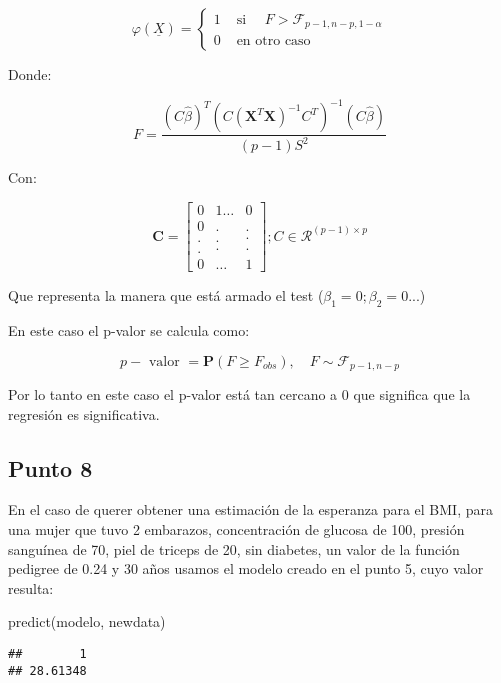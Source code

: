 \documentclass[
]{article}
\newenvironment{Shaded}{\begin{snugshade}}{\end{snugshade}}
\newcommand{\FunctionTok}[1]{\textcolor[rgb]{0.00,0.00,0.00}{#1}}
\newcommand{\NormalTok}[1]{#1}
\begin{document}
\[
\varphi(\underline{X})= \begin{cases}1 & \text { si } \quad F>\mathcal{F}_{p-1, n-p, 1-\alpha} \\ 0 & \text { en otro caso }\end{cases}
\]

Donde:

\[
F=\frac{(C \hat{\beta})^{T}\left(C\left(\mathbf{X}^{T} \mathbf{X}\right)^{-1} C^{T}\right)^{-1}(C \hat{\beta})}{(p - 1) S^{2}} 
\]

Con:

\[
\mathbf{C}=\left[\begin{array}{ccc}0 & 1 \ldots & 0 \\0 & . & . \\. & . & \cdot \\. & \cdot & \cdot \\0 & \ldots & 1\end{array}\right] ; C\in \mathcal{R}^{(p-1)\times p}
\]

Que representa la manera que está armado el test
(\(\beta_{1}=0 ; \beta_{2}=0 ...\))

En este caso el p-valor se calcula como:

\[
p-\text { valor }=\mathbf{P}\left(F \geq F_{o b s}\right), \quad F \sim \mathcal{F}_{p - 1, n-p}
\]

Por lo tanto en este caso el p-valor está tan cercano a 0 que significa
que la regresión es significativa.

\hypertarget{punto-8}{%
\subsection{Punto 8}\label{punto-8}}

En el caso de querer obtener una estimación de la esperanza para el BMI,
para una mujer que tuvo 2 embarazos, concentración de glucosa de 100,
presión sanguínea de 70, piel de triceps de 20, sin diabetes, un valor
de la función pedigree de 0.24 y 30 años usamos el modelo creado en el
punto 5, cuyo valor resulta:

\begin{Shaded}
\begin{Highlighting}[]
\FunctionTok{predict}\NormalTok{(modelo, newdata)}
\end{Highlighting}
\end{Shaded}

\begin{verbatim}
##        1 
## 28.61348
\end{verbatim}
\end{document}

